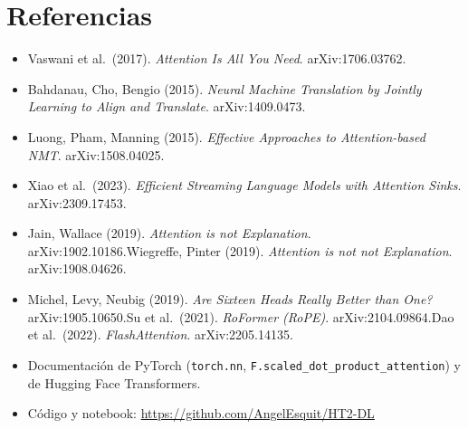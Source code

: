 \documentclass[10pt,letterpaper]{article}
\begin{document}
\section*{Referencias}
\begin{itemize}[leftmargin=1em,itemsep=0pt]\footnotesize
\item Vaswani et al.\ (2017). \emph{Attention Is All You Need}. arXiv:1706.03762.
\item Bahdanau, Cho, Bengio (2015). \emph{Neural Machine Translation by Jointly Learning to Align and Translate}. arXiv:1409.0473.
\item Luong, Pham, Manning (2015). \emph{Effective Approaches to Attention-based NMT}. arXiv:1508.04025.
\item Xiao et al.\ (2023). \emph{Efficient Streaming Language Models with Attention Sinks}. arXiv:2309.17453.
\item Jain, Wallace (2019). \emph{Attention is not Explanation}. arXiv:1902.10186.\quad Wiegreffe, Pinter (2019). \emph{Attention is not not Explanation}. arXiv:1908.04626.
\item Michel, Levy, Neubig (2019). \emph{Are Sixteen Heads Really Better than One?} arXiv:1905.10650.\quad Su et al.\ (2021). \emph{RoFormer (RoPE)}. arXiv:2104.09864.\quad Dao et al.\ (2022). \emph{FlashAttention}. arXiv:2205.14135.
\item Documentación de PyTorch (\texttt{torch.nn}, \texttt{F.scaled\_dot\_product\_attention}) y de Hugging Face Transformers.
\item Código y notebook: \url{https://github.com/AngelEsquit/HT2-DL}
\end{itemize}
\end{document}
